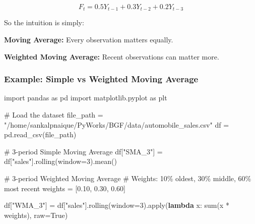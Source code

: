 \documentclass[
  a4paper,
]{article}
\newenvironment{Shaded}{\begin{snugshade}}{\end{snugshade}}
\newcommand{\BuiltInTok}[1]{\textcolor[rgb]{0.00,0.23,0.31}{#1}}
\newcommand{\CommentTok}[1]{\textcolor[rgb]{0.37,0.37,0.37}{#1}}
\newcommand{\DecValTok}[1]{\textcolor[rgb]{0.68,0.00,0.00}{#1}}
\newcommand{\FloatTok}[1]{\textcolor[rgb]{0.68,0.00,0.00}{#1}}
\newcommand{\ImportTok}[1]{\textcolor[rgb]{0.00,0.46,0.62}{#1}}
\newcommand{\KeywordTok}[1]{\textcolor[rgb]{0.00,0.23,0.31}{\textbf{#1}}}
\newcommand{\NormalTok}[1]{\textcolor[rgb]{0.00,0.23,0.31}{#1}}
\newcommand{\OperatorTok}[1]{\textcolor[rgb]{0.37,0.37,0.37}{#1}}
\newcommand{\StringTok}[1]{\textcolor[rgb]{0.13,0.47,0.30}{#1}}
\newcommand{\VariableTok}[1]{\textcolor[rgb]{0.07,0.07,0.07}{#1}}
\begin{document}
\[ \boxed{F_t=0.5Y_{t-1}+0.3Y_{t-2}+0.2Y_{t-3}} \]

So the intuition is simply:

\textbf{Moving Average:} Every observation matters equally.

\textbf{Weighted Moving Average:} Recent observations can matter more.

\subsubsection{Example: Simple vs Weighted Moving
Average}\label{example-simple-vs-weighted-moving-average}

\begin{tcolorbox}[enhanced jigsaw, arc=.35mm, bottomrule=.15mm, bottomtitle=1mm, breakable, colback=white, colbacktitle=quarto-callout-tip-color!10!white, colframe=quarto-callout-tip-color-frame, coltitle=black, left=2mm, leftrule=.75mm, opacityback=0, opacitybacktitle=0.6, rightrule=.15mm, title=\textcolor{quarto-callout-tip-color}{\faLightbulb}\hspace{0.5em}{💻 Coding Session}, titlerule=0mm, toprule=.15mm, toptitle=1mm]

\begin{Shaded}
\begin{Highlighting}[]
\ImportTok{import}\NormalTok{ pandas }\ImportTok{as}\NormalTok{ pd}
\ImportTok{import}\NormalTok{ matplotlib.pyplot }\ImportTok{as}\NormalTok{ plt}

\CommentTok{\# Load the dataset}
\NormalTok{file\_path }\OperatorTok{=} \StringTok{"/home/sankalpnaique/PyWorks/BGF/data/automobile\_sales.csv"}
\NormalTok{df }\OperatorTok{=}\NormalTok{ pd.read\_csv(file\_path)}

\CommentTok{\# 3{-}period Simple Moving Average}
\NormalTok{df[}\StringTok{"SMA\_3"}\NormalTok{] }\OperatorTok{=}\NormalTok{ df[}\StringTok{"sales"}\NormalTok{].rolling(window}\OperatorTok{=}\DecValTok{3}\NormalTok{).mean()}

\CommentTok{\# 3{-}period Weighted Moving Average}
\CommentTok{\# Weights: 10\% oldest, 30\% middle, 60\% most recent}
\NormalTok{weights }\OperatorTok{=}\NormalTok{ [}\FloatTok{0.10}\NormalTok{, }\FloatTok{0.30}\NormalTok{, }\FloatTok{0.60}\NormalTok{]}

\NormalTok{df[}\StringTok{"WMA\_3"}\NormalTok{] }\OperatorTok{=}\NormalTok{ df[}\StringTok{"sales"}\NormalTok{].rolling(window}\OperatorTok{=}\DecValTok{3}\NormalTok{).}\BuiltInTok{apply}\NormalTok{(}\KeywordTok{lambda}\NormalTok{ x: }\BuiltInTok{sum}\NormalTok{(x }\OperatorTok{*}\NormalTok{ weights), raw}\OperatorTok{=}\VariableTok{True}\NormalTok{)}


\end{Highlighting}
\end{Shaded}
\end{tcolorbox}
\end{document}
